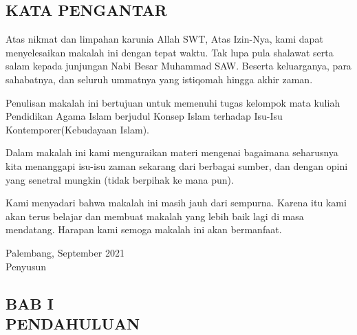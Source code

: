 \documentclass[a4paper,12 pt]{article}%
\begin{document}
\begin{center}
    \section*{KATA PENGANTAR}
\end{center}
Atas nikmat dan limpahan karunia Allah SWT, Atas Izin-Nya, kami dapat menyelesaikan makalah ini 
dengan tepat waktu. Tak lupa pula shalawat serta salam kepada junjungan Nabi Besar Muhammad SAW.
Beserta keluarganya, para sahabatnya, dan seluruh ummatnya yang istiqomah hingga akhir zaman.

Penulisan makalah ini bertujuan untuk memenuhi tugas kelompok mata kuliah Pendidikan Agama Islam
berjudul Konsep Islam terhadap Isu-Isu Kontemporer(Kebudayaan Islam).

Dalam makalah ini kami menguraikan materi mengenai bagaimana seharusnya kita menanggapi isu-isu
zaman sekarang dari berbagai sumber, dan dengan opini yang senetral mungkin (tidak berpihak ke mana 
pun).

Kami menyadari bahwa makalah ini masih jauh dari sempurna. Karena itu kami akan terus belajar
dan membuat makalah yang lebih baik lagi di masa mendatang. Harapan kami semoga makalah ini 
akan bermanfaat. 
\\
\begin{flushright}
Palembang, September 2021\\[1\baselineskip]%

Penyusun
\end{flushright}
\clearpage

\thispagestyle{empty} %
\renewcommand{\contentsname}{\hfill\bfseries\Large DAFTAR ISI\hfill}%
\renewcommand{\cftaftertoctitle}{\hfill}%
\tableofcontents
\clearpage

\begin{center}
    \section*{BAB I\\PENDAHULUAN}%
\end{center}
\setcounter{subsection}{0}%
\end{document}
